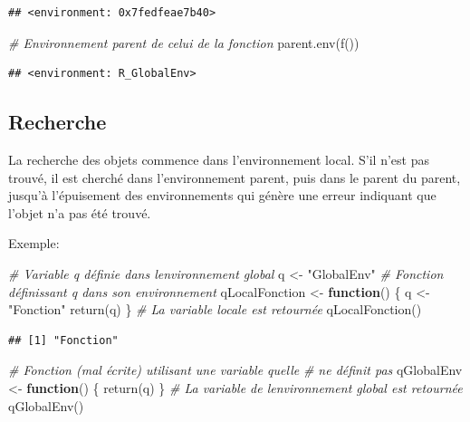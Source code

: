 \documentclass[
  11pt,
  french,
  a4paper,
  extrafontsizes,onecolumn,openright
  ]{memoir}
\newenvironment{Shaded}{\begin{snugshade}}{\end{snugshade}}
\newcommand{\CommentTok}[1]{\textcolor[rgb]{0.56,0.35,0.01}{\textit{#1}}}
\newcommand{\ControlFlowTok}[1]{\textcolor[rgb]{0.13,0.29,0.53}{\textbf{#1}}}
\newcommand{\FunctionTok}[1]{\textcolor[rgb]{0.00,0.00,0.00}{#1}}
\newcommand{\NormalTok}[1]{#1}
\newcommand{\OtherTok}[1]{\textcolor[rgb]{0.56,0.35,0.01}{#1}}
\newcommand{\StringTok}[1]{\textcolor[rgb]{0.31,0.60,0.02}{#1}}
\begin{document}
\begin{verbatim}
## <environment: 0x7fedfeae7b40>
\end{verbatim}

\begin{Shaded}
\begin{Highlighting}[]
\CommentTok{\# Environnement parent de celui de la fonction}
\FunctionTok{parent.env}\NormalTok{(}\FunctionTok{f}\NormalTok{())}
\end{Highlighting}
\end{Shaded}

\begin{verbatim}
## <environment: R_GlobalEnv>
\end{verbatim}

\normalsize

\hypertarget{recherche}{%
\subsection{Recherche}\label{recherche}}

La recherche des objets commence dans l'environnement local.
S'il n'est pas trouvé, il est cherché dans l'environnement parent, puis dans le parent du parent, jusqu'à l'épuisement des environnements qui génère une erreur indiquant que l'objet n'a pas été trouvé.

Exemple:

\scriptsize

\begin{Shaded}
\begin{Highlighting}[]
\CommentTok{\# Variable q définie dans l\textquotesingle{}environnement global}
\NormalTok{q }\OtherTok{\textless{}{-}} \StringTok{"GlobalEnv"}
\CommentTok{\# Fonction définissant q dans son environnement}
\NormalTok{qLocalFonction }\OtherTok{\textless{}{-}} \ControlFlowTok{function}\NormalTok{() \{}
\NormalTok{    q }\OtherTok{\textless{}{-}} \StringTok{"Fonction"}
    \FunctionTok{return}\NormalTok{(q)}
\NormalTok{\}}
\CommentTok{\# La variable locale est retournée}
\FunctionTok{qLocalFonction}\NormalTok{()}
\end{Highlighting}
\end{Shaded}

\begin{verbatim}
## [1] "Fonction"
\end{verbatim}

\begin{Shaded}
\begin{Highlighting}[]
\CommentTok{\# Fonction (mal écrite) utilisant une variable qu\textquotesingle{}elle}
\CommentTok{\# ne définit pas}
\NormalTok{qGlobalEnv }\OtherTok{\textless{}{-}} \ControlFlowTok{function}\NormalTok{() \{}
    \FunctionTok{return}\NormalTok{(q)}
\NormalTok{\}}
\CommentTok{\# La variable de l\textquotesingle{}environnement global est retournée}
\FunctionTok{qGlobalEnv}\NormalTok{()}
\end{Highlighting}
\end{Shaded}
\end{document}
